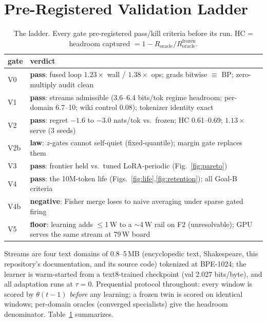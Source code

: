 \documentclass{article}
\begin{document}
\section{Pre-Registered Validation Ladder}
\label{sec:ladder}

\begin{table}[t]
\caption{The ladder. Every gate pre-registered pass/kill criteria before its
run. HC = headroom captured $=1-R_{\mathrm{oracle}}/R^{\mathrm{frozen}}_{\mathrm{oracle}}$.}
\label{tab:ladder}
\vskip 0.05in
\centering
\scriptsize
\begin{tabular}{@{}lp{5.35cm}@{}}
\toprule
gate & verdict \\
\midrule
V0 & \textbf{pass}: fused loop $1.23\times$ wall / $1.38\times$ ops; grads
bitwise $\equiv$ BP; zero-multiply audit clean \\
V1 & \textbf{pass}: streams admissible (3.6--6.4 bits/tok regime headroom;
per-domain 6.7--10; wiki control 0.08); tokenizer identity exact \\
V2 & \textbf{pass}: regret $-1.6$ to $-3.0$ nats/tok vs.\ frozen; HC
0.61--0.69; $1.13\times$ serve (3 seeds) \\
V2b & \textbf{law}: $z$-gates cannot self-quiet (fixed-quantile); margin gate
replaces them \\
V3 & \textbf{pass}: frontier held vs.\ tuned LoRA-periodic (Fig.~\ref{fig:pareto}) \\
V4 & \textbf{pass}: the 10M-token life (Figs.~\ref{fig:life},\ref{fig:retention});
all Goal-B criteria \\
V4b & \textbf{negative}: Fisher merge loses to naive averaging under sparse
gated firing \\
V5 & \textbf{floor}: learning adds $\le$1\,W to a $\sim$4\,W rail on F2
(unresolvable); GPU serves the same stream at 79\,W board \\
\bottomrule
\end{tabular}
\vskip -0.1in
\end{table}

Streams are four text domains of 0.8--5\,MB (encyclopedic text,
Shakespeare, this repository's documentation, and its source code)
tokenized at BPE-1024; the learner is
warm-started from a text8-trained checkpoint (val 2.027 bits/byte), and all
adaptation runs at $\tau{=}0$. Prequential protocol throughout: every window
is scored by $\theta(t{-}1)$ \emph{before} any learning; a frozen twin is
scored on identical windows; per-domain oracles (converged specialists) give
the headroom denominator. Table~\ref{tab:ladder} summarizes.
\end{document}
